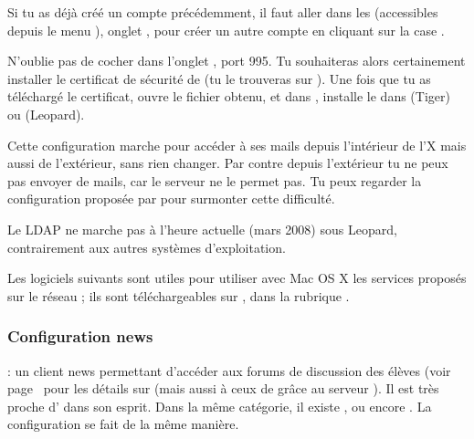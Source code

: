 Si tu as déjà créé un compte précédemment, il faut aller dans les  (accessibles depuis le menu ), onglet , pour créer un autre compte en cliquant sur la case \menu{+}.

N'oublie pas de cocher  dans l'onglet , port 995. Tu souhaiteras alors certainement installer le certificat de sécurité de  (tu le trouveras sur ). Une fois que tu as téléchargé le certificat, ouvre le fichier  obtenu, et dans , installe le dans  (Tiger) ou  (Leopard).

Cette configuration marche pour accéder à ses mails depuis l'intérieur de l'X mais aussi de l'extérieur, sans rien changer. Par contre depuis l'extérieur tu ne peux pas envoyer de mails, car le serveur  ne le permet pas. Tu peux regarder la configuration proposée par  pour surmonter cette difficulté.

Le LDAP ne marche pas à l'heure actuelle (mars 2008) sous Leopard, contrairement aux  autres systèmes d'exploitation.


Les logiciels suivants sont utiles pour utiliser avec Mac OS X les services proposés sur le réseau ; ils sont téléchargeables sur , dans la rubrique .


\subsubsection{Configuration news}

  : un client news permettant d'accéder aux forums de discussion des élèves (voir page~\pageref{newsgroups} pour les détails sur  (mais aussi à ceux de  grâce au serveur ). Il est très proche d' dans son esprit. Dans la même catégorie, il existe ,  ou encore . La configuration se fait de la même manière.

